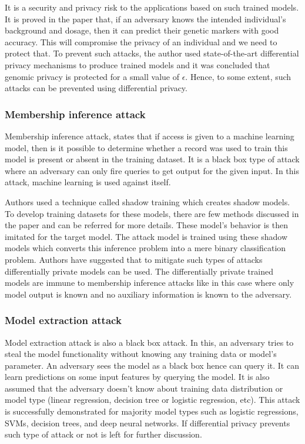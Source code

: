 It is a security and privacy risk to the applications based on such trained models. It is proved in the paper that, if an adversary knows the intended individual's background and dosage, then it can predict their genetic markers with good accuracy. This will compromise the privacy of an individual and we need to protect that. To prevent such attacks, the author used state-of-the-art differential privacy mechanisms to produce trained models and it was concluded that genomic privacy is protected for a small value of $\epsilon$. Hence, to some extent, such attacks can be prevented using differential privacy.

\subsubsection{Membership inference attack}
Membership inference attack, \cite{16} states that if access is given to a machine learning model, then is it possible to determine whether a record was used to train this model is present or absent in the training dataset. It is a black box type of attack where an adversary can only fire queries to get output for the given input. In this attack, machine learning is used against itself. 

Authors used a technique called shadow training which creates shadow models. To develop training datasets for these models, there are few methods discussed in the paper \cite{16} and can be referred for more details. These model's behavior is then imitated for the target model. The attack model is trained using these shadow models which converts this inference problem into a mere binary classification problem. Authors have suggested that to mitigate such types of attacks differentially private models can be used. The differentially private trained models are immune to membership inference attacks like in this case where only model output is known and no auxiliary information is known to the adversary.

\subsubsection{Model extraction attack}
Model extraction attack \cite{73} is also a black box attack. In this, an adversary tries to steal the model functionality without knowing any training data or model's parameter. An adversary sees the model as a black box hence can query it. It can learn predictions on some input features by querying the model. It is also assumed that the adversary doesn't know about training data distribution or model type (linear regression, decision tree or logistic regression, etc). This attack is successfully demonstrated for majority model types such as logistic regressions, SVMs, decision trees, and deep neural networks. If differential privacy prevents such type of attack or not is left for further discussion.

